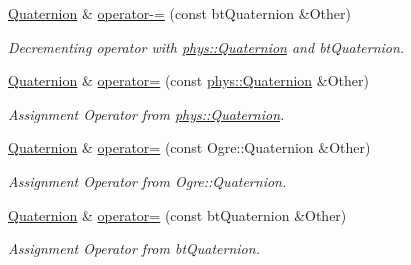 \begin{DoxyCompactItemize}
\hyperlink{classphys_1_1Quaternion}{Quaternion} \& \hyperlink{classphys_1_1Quaternion_abd1e9d740b3af194c60466105d07f6ff}{operator-\/=} (const btQuaternion \&Other)
\begin{DoxyCompactList}\small\item\em Decrementing operator with \hyperlink{classphys_1_1Quaternion}{phys::Quaternion} and btQuaternion. \item\end{DoxyCompactList}\item 
\hyperlink{classphys_1_1Quaternion}{Quaternion} \& \hyperlink{classphys_1_1Quaternion_a6213bddf8f928a8510260b9deb712fd7}{operator=} (const \hyperlink{classphys_1_1Quaternion}{phys::Quaternion} \&Other)
\begin{DoxyCompactList}\small\item\em Assignment Operator from \hyperlink{classphys_1_1Quaternion}{phys::Quaternion}. \item\end{DoxyCompactList}\item 
\hyperlink{classphys_1_1Quaternion}{Quaternion} \& \hyperlink{classphys_1_1Quaternion_a6b9fe92548e3fd114d7419ddd5d5a660}{operator=} (const Ogre::Quaternion \&Other)
\begin{DoxyCompactList}\small\item\em Assignment Operator from Ogre::Quaternion. \item\end{DoxyCompactList}\item 
\hyperlink{classphys_1_1Quaternion}{Quaternion} \& \hyperlink{classphys_1_1Quaternion_a05e7364791bf7f38ad63dc59184cd5ca}{operator=} (const btQuaternion \&Other)
\begin{DoxyCompactList}\small\item\em Assignment Operator from btQuaternion. \item\end{DoxyCompactList}\end{DoxyCompactItemize}
